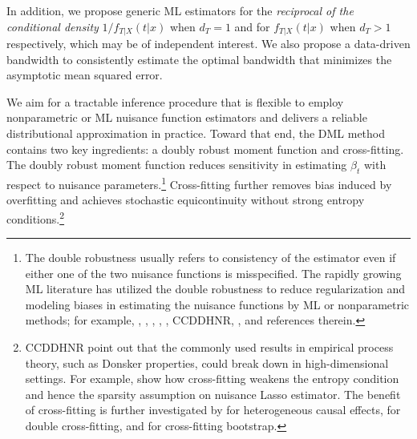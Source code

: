 \documentclass[lettersize, 12pt]{article}
\begin{document}
In addition, we propose generic ML estimators for the {\it reciprocal of the conditional density} $1/f_{T|X}(t|x)$ when $d_T = 1$ and for $f_{T|X}(t|x)$ when $d_T > 1$ respectively, which may be of independent interest.
We also propose a data-driven bandwidth to consistently estimate the optimal bandwidth that minimizes the asymptotic mean squared error.

We aim for a tractable inference procedure that is flexible to employ 
nonparametric or ML nuisance function estimators and delivers a reliable distributional approximation in practice.
Toward that end, the DML method contains two key ingredients: a doubly robust moment function and cross-fitting.
The doubly robust moment function reduces sensitivity in estimating $\beta_t$ with respect to nuisance parameters.\footnote{
The double robustness usually refers to consistency of the estimator even if either one of the two nuisance functions is misspecified.
The rapidly growing ML literature has utilized the double robustness 
to reduce regularization and modeling biases in estimating the nuisance functions by ML or nonparametric methods;
for example, \cite{BCH14RES}, \cite{Farrell15},  \cite{BCFH17}, \cite{Farrell18}, \cite{CEINR}, CCDDHNR, \cite{RotheFirpo}, and references therein.
}
Cross-fitting further removes bias induced by overfitting and achieves stochastic equicontinuity without strong entropy conditions.\footnote{
CCDDHNR  point out that the commonly used results in empirical process theory, such as Donsker properties, could break down in high-dimensional settings.
For example, \cite{BCFH17} show how cross-fitting weakens the entropy condition and hence the sparsity assumption on nuisance Lasso estimator.
The benefit of cross-fitting is further investigated by \cite{WagerAthey} for heterogeneous causal effects, \cite{NeweyRobins} for double cross-fitting, and \cite{CJ19ET} for cross-fitting bootstrap.}
\end{document}
